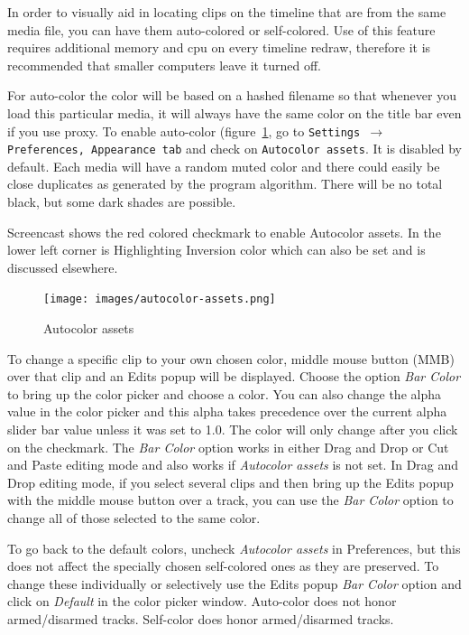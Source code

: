 In order to visually aid in locating clips on the timeline that are from the same media file, you can have them auto-colored or self-colored.  
Use of this feature requires additional memory and cpu on every timeline redraw, therefore it is recommended that smaller computers leave it turned off.

For auto-color the color will be based on a hashed filename so that whenever you load this particular media, it will always have the same color on the title bar even if you use proxy.  
To enable auto-color (figure~\ref{fig:autocolor_assets}, go to \texttt{Settings $\rightarrow$ Preferences, Appearance tab} and check on \texttt{Autocolor assets}.  
It is disabled by default.  
Each media will have a random muted color and there could easily be close duplicates as generated by the program algorithm.  There will be no total black, but some dark shades are possible.  

Screencast shows the red colored checkmark to enable Autocolor assets.  
In the lower left corner is Highlighting Inversion color which can also be set and is discussed elsewhere.

\begin{figure}[htpb]
    \centering
    \texttt{[image: images/autocolor-assets.png]}
    \caption{Autocolor assets}
    \label{fig:autocolor_assets}
\end{figure}

To change a specific clip to your own chosen color, middle mouse button (MMB) over that clip and an Edits popup will be displayed.  
Choose the option \textit{Bar Color} to bring up the color picker and choose a color.   
You can also change the alpha value in the color picker and this alpha takes precedence over the current alpha slider bar value unless it was set to 1.0.   
The color will only change after you click on the checkmark.  
The \emph{Bar Color} option works in either Drag and Drop or Cut and Paste editing mode and also works if \textit{Autocolor assets} is not set.  
In Drag and Drop editing mode, if you select several clips and then bring up the Edits popup with the middle mouse button over a track, you can use the \emph{Bar Color} option to change all of those selected to the same color.

To go back to the default colors, uncheck \textit{Autocolor assets} in Preferences, but this does not affect the specially chosen self-colored ones as they are preserved.  
To change these individually or  selectively use the Edits popup \emph{Bar Color} option and click on \textit{Default} in the color picker window.  Auto-color does not honor armed/disarmed tracks.  
Self-color does honor armed/disarmed tracks.

